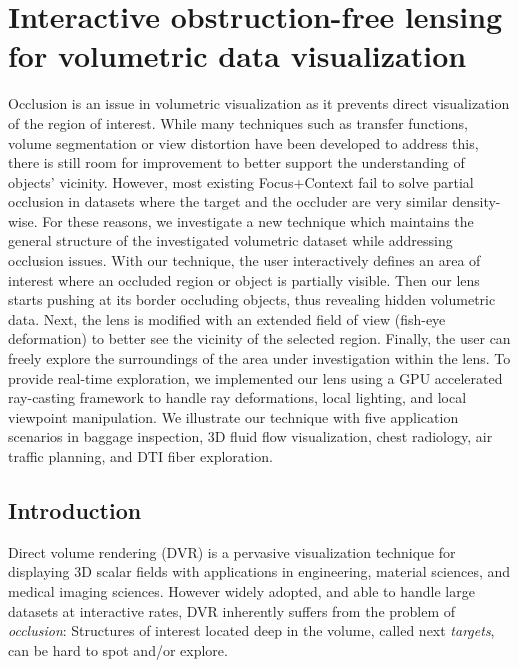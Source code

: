 \chapter{Interactive obstruction-free lensing for volumetric data visualization}
\label{lensing}

Occlusion is an issue in volumetric visualization as it prevents direct visualization of the region of interest. While many techniques such as transfer functions, volume segmentation or view distortion have been developed to address this, there is still room for improvement to better support the understanding of objects' vicinity. However, most existing Focus+Context fail to solve partial occlusion in datasets where the target and the occluder are very similar density-wise. For these reasons, we investigate a new technique which maintains the general structure of the investigated volumetric dataset while addressing occlusion issues. With our technique, the user interactively defines an area of interest where an occluded region or object is partially visible. Then our lens starts pushing at its border occluding objects, thus revealing hidden volumetric data. Next, the lens is modified with an extended field of view (fish-eye deformation) to better see the vicinity of the selected region. Finally, the user can freely explore the surroundings of the area under investigation within the lens. To provide real-time exploration, we implemented our lens using a GPU accelerated ray-casting framework
to handle ray deformations, local lighting, and local viewpoint manipulation. We illustrate our technique with five application scenarios in baggage inspection, 3D fluid flow visualization, chest radiology, air traffic planning, and DTI fiber exploration.

\section{Introduction}
Direct volume rendering (DVR) is a pervasive visualization technique for displaying 3D scalar fields with applications in engineering, material sciences, and medical imaging sciences. However widely adopted, and able to handle large datasets at interactive rates, DVR inherently suffers from the problem of \emph{occlusion}: Structures of interest located deep in the volume, called next \emph{targets}, can be hard to spot and/or explore.

